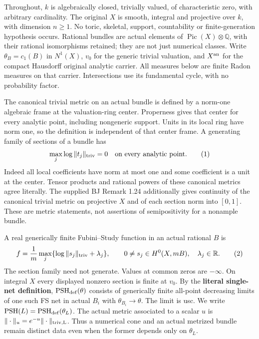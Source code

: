 \documentclass[
  10pt,
]{article}
\begin{document}
Throughout, \(k\) is algebraically closed, trivially valued, of
characteristic zero, with arbitrary cardinality. The original \(X\) is
smooth, integral and projective over \(k\), with dimension \(n\geq1\).
No toric, skeletal, support, countability or finite-generation
hypothesis occurs. Rational bundles are actual elements of
\(\operatorname{Pic}(X)\otimes\mathbb Q\), with their rational
isomorphisms retained; they are not just numerical classes. Write
\(\theta_B=c_1(B)\) in \(N^1(X)\), \(v_0\) for the generic trivial
valuation, and \(X^{\rm an}\) for the compact Hausdorff original
analytic carrier. All measures below are finite Radon measures on that
carrier. Intersections use its fundamental cycle, with no probability
factor.

The canonical trivial metric on an actual bundle is defined by a
norm-one algebraic frame at the valuation-ring center. Properness gives
that center for every analytic point, including nongeneric support.
Units in its local ring have norm one, so the definition is independent
of that center frame. A generating family of sections of a bundle has
\[\max_j\log\|t_j\|_{\rm triv}=0\quad\hbox{on every analytic point}.\tag{1}\]
Indeed all local coefficients have norm at most one and some coefficient
is a unit at the center. Tensor products and rational powers of these
canonical metrics agree literally. The supplied BJ Remark 1.24
additionally gives continuity of the canonical trivial metric on
projective \(X\) and of each section norm into \([0,1]\). These are
metric statements, not assertions of semipositivity for a nonample
bundle.

A real generically finite Fubini--Study function in an actual rational
\(B\) is \[f=\frac1m\max_j\{\log\|s_j\|_{\rm triv}+\lambda_j\},\qquad
0\ne s_j\in H^0(X,mB),\quad \lambda_j\in\mathbb R.\tag{2}\] The section
family need not generate. Values at common zeros are \(-\infty\). On
integral \(X\) every displayed nonzero section is finite at \(v_0\). By
the \textbf{literal single-net definition},
\(\operatorname{PSH}_{\rm def}(\theta)\) consists of generically finite
all-point decreasing limits of one such FS net in actual \(B_i\) with
\(\theta_{B_i}\longrightarrow\theta\). The limit is usc. We write
\(\operatorname{PSH}(L)=\operatorname{PSH}_{\rm def}(\theta_L)\). The
actual metric associated to a scalar \(u\) is
\(\|\cdot\|_u=e^{-u}\|\cdot\|_{\rm triv,L}\). Thus a numerical cone and
an actual metrized bundle remain distinct data even when the former
depends only on \(\theta_L\).
\end{document}
